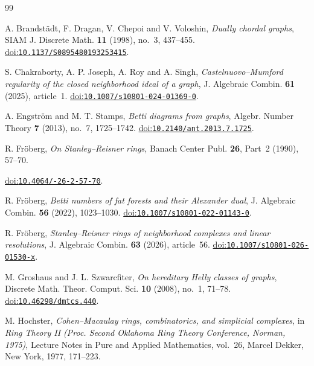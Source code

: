 \documentclass[11pt]{amsart}
\theoremstyle{definition}
\theoremstyle{remark}
\numberwithin{equation}{section}
\begin{document}
	

	\begingroup
	\small
	\begin{thebibliography}{99}
		
		A. Brandst\"adt, F. Dragan, V. Chepoi and V. Voloshin,
		\emph{Dually chordal graphs},
		SIAM J. Discrete Math. \textbf{11} (1998), no.~3, 437--455.
		\href{https://doi.org/10.1137/S0895480193253415}{doi:\nolinkurl{10.1137/S0895480193253415}}.
		
		S. Chakraborty, A. P. Joseph, A. Roy and A. Singh,
		\emph{Castelnuovo--Mumford regularity of the closed neighborhood ideal of a graph},
		J. Algebraic Combin. \textbf{61} (2025), article~1.
		\href{https://doi.org/10.1007/s10801-024-01369-0}{doi:\nolinkurl{10.1007/s10801-024-01369-0}}.
		
		A. Engstr\"om and M. T. Stamps,
		\emph{Betti diagrams from graphs},
		Algebr. Number Theory \textbf{7} (2013), no.~7, 1725--1742.
		\href{https://doi.org/10.2140/ant.2013.7.1725}{doi:\nolinkurl{10.2140/ant.2013.7.1725}}.
		
		R. Fr\"oberg,
		\emph{On Stanley--Reisner rings},
		Banach Center Publ. \textbf{26}, Part~2 (1990), 57--70.
		
		\href{https://doi.org/10.4064/-26-2-57-70}{doi:\nolinkurl{10.4064/-26-2-57-70}}.
		
		R. Fr\"oberg,
		\emph{Betti numbers of fat forests and their Alexander dual},
		J. Algebraic Combin. \textbf{56} (2022), 1023--1030.
		\href{https://doi.org/10.1007/s10801-022-01143-0}{doi:\nolinkurl{10.1007/s10801-022-01143-0}}.
		
		R. Fr\"oberg,
		\emph{Stanley--Reisner rings of neighborhood complexes and linear resolutions},
		J. Algebraic Combin. \textbf{63} (2026), article~56.
		\href{https://doi.org/10.1007/s10801-026-01530-x}{doi:\nolinkurl{10.1007/s10801-026-01530-x}}.
		
		M. Groshaus and J. L. Szwarcfiter,
		\emph{On hereditary Helly classes of graphs},
		Discrete Math. Theor. Comput. Sci. \textbf{10} (2008), no.~1, 71--78.
		\href{https://doi.org/10.46298/dmtcs.440}{doi:\nolinkurl{10.46298/dmtcs.440}}.
		
		M. Hochster,
		\emph{Cohen--Macaulay rings, combinatorics, and simplicial complexes},
		in \emph{Ring Theory II (Proc. Second Oklahoma Ring Theory Conference, Norman, 1975)},
		Lecture Notes in Pure and Applied Mathematics, vol.~26,
		Marcel Dekker, New York, 1977, 171--223.
		

\end{thebibliography}
\end{document}
